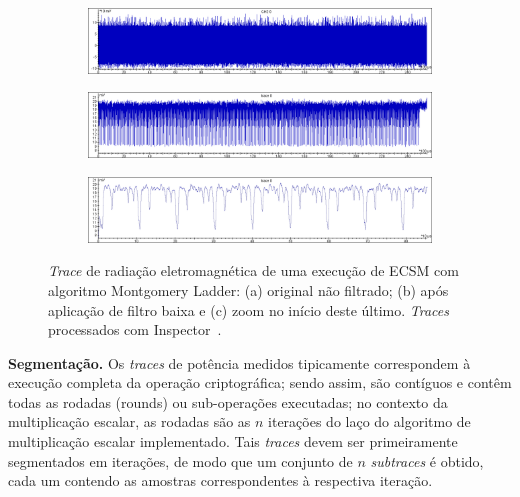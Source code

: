 \documentclass{SBCbookchapter}
\begin{document}
\begin{figure}	
	\centering
	\begin{subfigure}[b]{0.8\textwidth}
		\includegraphics[width=1\linewidth]{figures/Trace_EM___MontLadder___CPU_168MHz___SR_1GHz___32MS___UNFiltered.png}
		\caption{}
		\label{fig:traceUnfiltered} 
	\end{subfigure}
	
	\begin{subfigure}[b]{0.8\textwidth}
		\includegraphics[width=1\linewidth]{figures/Trace_EM___MontLadder___CPU_168MHz___SR_1GHz___32MS___Filtered.png}
		\caption{}
		\label{fig:filtered}
	\end{subfigure}	

	\begin{subfigure}[b]{0.8\textwidth}
		\includegraphics[width=1\linewidth]{figures/Trace_EM___MontLadder___CPU_168MHz___SR_1GHz___32MS___Filtered___Zoom_in.png}
		\caption{}
		\label{fig:filteredZoomIn}
	\end{subfigure}
	\label{fig:tracesFiltering}
	\caption{\emph{Trace} de radiação eletromagnética de uma execução de ECSM com algoritmo Montgomery Ladder: (a) original não filtrado; (b) após aplicação de filtro baixa e (c) zoom no início deste último. \emph{Traces} processados com Inspector~\cite{RiscureInspector}.}
\end{figure}

\noindent \textbf{Segmentação.} Os \emph{traces} de potência medidos tipicamente correspondem à execução completa da operação criptográfica; sendo assim, são contíguos e contêm todas as rodadas (rounds) ou sub-operações executadas; no contexto da multiplicação escalar, as rodadas são as $n$ iterações do laço do algoritmo de multiplicação escalar implementado. Tais \emph{traces} devem ser primeiramente segmentados em iterações, de modo que um conjunto de $n$ \emph{subtraces} é obtido, cada um contendo as amostras correspondentes à respectiva iteração.
\end{document}

